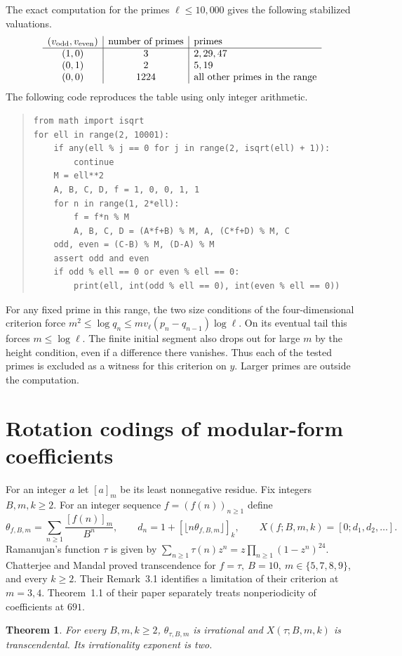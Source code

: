 \documentclass[11pt,a4paper]{article}
\newtheorem{theorem}{Theorem}[section]
\begin{document}
The exact computation for the primes \(\ell\le10{,}000\) gives the following
stabilized valuations.
\[
\begin{array}{c|c|l}
 (v_{\rm odd},v_{\rm even}) & \text{number of primes} & \text{primes}\\ \hline
 (1,0)&3&2,29,47\\
 (0,1)&2&5,19\\
 (0,0)&1224&\text{all other primes in the range}
\end{array}
\]
The following code reproduces the table using only integer arithmetic.
\begin{quote}\small
\begin{verbatim}
from math import isqrt
for ell in range(2, 10001):
    if any(ell % j == 0 for j in range(2, isqrt(ell) + 1)):
        continue
    M = ell**2
    A, B, C, D, f = 1, 0, 0, 1, 1
    for n in range(1, 2*ell):
        f = f*n % M
        A, B, C, D = (A*f+B) % M, A, (C*f+D) % M, C
    odd, even = (C-B) % M, (D-A) % M
    assert odd and even
    if odd % ell == 0 or even % ell == 0:
        print(ell, int(odd % ell == 0), int(even % ell == 0))
\end{verbatim}
\end{quote}
For any fixed prime in this range, the two size conditions of the
four-dimensional criterion force
\(m^2\le\log q_n\le m v_\ell(p_n-q_{n-1})\log\ell\).
On its eventual tail this forces \(m\le\log\ell\). The finite initial
segment also drops out for large \(m\) by the height condition, even
if a difference there vanishes. Thus each of the tested primes is
excluded as a witness for this criterion on \(y\). Larger primes are
outside the computation.



\section{Rotation codings of modular-form coefficients}\label{sec:hecke}
For an integer \(a\) let \([a]_m\) be its least nonnegative residue. Fix integers \(B,m,k\ge2\). For an integer sequence \(f=(f(n))_{n\ge1}\) define
\[
 \theta_{f,B,m}=\sum_{n\ge1}\frac{[f(n)]_m}{B^n},\qquad
 d_n=1+[\lfloor n\theta_{f,B,m}\rfloor]_k,\qquad
 X(f;B,m,k)=[0;d_1,d_2,\ldots].
\]
Ramanujan's function \(\tau\) is given by \(\sum_{n\ge1}\tau(n)z^n=z\prod_{n\ge1}(1-z^n)^{24}\).
Chatterjee and Mandal \cite[Thm.~1.11(1)]{cm} proved transcendence for \(f=\tau,\ B=10,\ m\in\{5,7,8,9\}\), and every \(k\ge2\). Their Remark~3.1 identifies a limitation of their criterion at \(m=3,4\). Theorem~1.1 of their paper separately treats nonperiodicity of coefficients at \(691\).
\begin{theorem}\label{th:tau}
For every \(B,m,k\ge2\), \(\theta_{\tau,B,m}\) is irrational and \(X(\tau;B,m,k)\) is transcendental. Its irrationality exponent is two.
\end{theorem}
\end{document}
